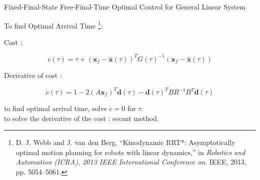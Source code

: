 \documentclass{beamer}
\begin{document}
\begin{frame}{Fixed-Final-State Free-Final-Time Optimal Control for General Linear System}

To find Optimal Arrival Time \footnote{D. J. Webb and J. van den Berg, “Kinodynamic RRT*: Asymptotically optimal
motion planning for robots with linear dynamics,” in \emph{Robotics and Automation
(ICRA), 2013 IEEE International Conference on}. IEEE, 2013, pp. 5054–5061.}:

Cost :

$$
c(\tau) = \tau + (\boldsymbol{x}_f - \boldsymbol{\bar{x}}(\tau))^{T}G(\tau)^{-1}(\boldsymbol{x}_f-\boldsymbol{\bar{x}}(\tau))
$$

Derivative of cost :

$$
\dot{c}(\tau) = 1 - 2(A\boldsymbol{x}_f)^{T}\boldsymbol{d}(\tau)-\boldsymbol{d}(\tau)^{T}BR^{-1}B^{T}\boldsymbol{d}(\tau)
$$

to find optimal arrival time, solve $\dot{c}=0$ for $\tau$. \\
to solve the derivative of the cost : secant method.

\end{frame}
\end{document}
